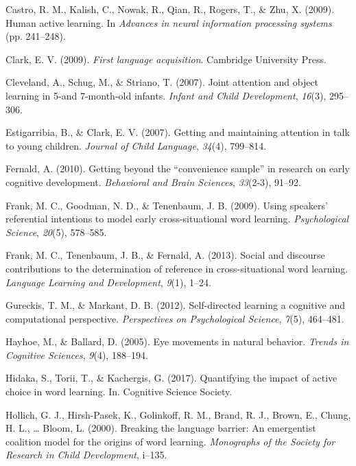 \documentclass[man,floatsintext]{apa6}
\begin{document}
\hypertarget{ref-castro2009human}{}
Castro, R. M., Kalish, C., Nowak, R., Qian, R., Rogers, T., \& Zhu, X.
(2009). Human active learning. In \emph{Advances in neural information
processing systems} (pp. 241--248).

\hypertarget{ref-clark2009first}{}
Clark, E. V. (2009). \emph{First language acquisition}. Cambridge
University Press.

\hypertarget{ref-cleveland2007joint}{}
Cleveland, A., Schug, M., \& Striano, T. (2007). Joint attention and
object learning in 5-and 7-month-old infants. \emph{Infant and Child
Development}, \emph{16}(3), 295--306.

\hypertarget{ref-estigarribia2007getting}{}
Estigarribia, B., \& Clark, E. V. (2007). Getting and maintaining
attention in talk to young children. \emph{Journal of Child Language},
\emph{34}(4), 799--814.

\hypertarget{ref-fernald2010getting}{}
Fernald, A. (2010). Getting beyond the ``convenience sample'' in
research on early cognitive development. \emph{Behavioral and Brain
Sciences}, \emph{33}(2-3), 91--92.

\hypertarget{ref-frank2009using}{}
Frank, M. C., Goodman, N. D., \& Tenenbaum, J. B. (2009). Using
speakers' referential intentions to model early cross-situational word
learning. \emph{Psychological Science}, \emph{20}(5), 578--585.

\hypertarget{ref-frank2013social}{}
Frank, M. C., Tenenbaum, J. B., \& Fernald, A. (2013). Social and
discourse contributions to the determination of reference in
cross-situational word learning. \emph{Language Learning and
Development}, \emph{9}(1), 1--24.

\hypertarget{ref-gureckis2012self}{}
Gureckis, T. M., \& Markant, D. B. (2012). Self-directed learning a
cognitive and computational perspective. \emph{Perspectives on
Psychological Science}, \emph{7}(5), 464--481.

\hypertarget{ref-hayhoe2005eye}{}
Hayhoe, M., \& Ballard, D. (2005). Eye movements in natural behavior.
\emph{Trends in Cognitive Sciences}, \emph{9}(4), 188--194.

\hypertarget{ref-hidaka2017quantifying}{}
Hidaka, S., Torii, T., \& Kachergis, G. (2017). Quantifying the impact
of active choice in word learning. In. Cognitive Science Society.

\hypertarget{ref-hollich2000breaking}{}
Hollich, G. J., Hirsh-Pasek, K., Golinkoff, R. M., Brand, R. J., Brown,
E., Chung, H. L., \ldots{} Bloom, L. (2000). Breaking the language
barrier: An emergentist coalition model for the origins of word
learning. \emph{Monographs of the Society for Research in Child
Development}, i--135.
\end{document}

